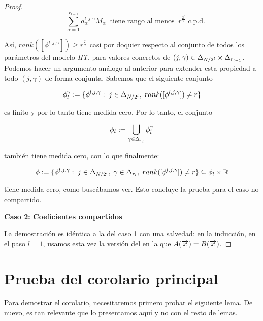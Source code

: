 \begin{proof}
    \begin{equation}
        [\phi^{l, j, \gamma}] = \sum_{\alpha = 1}^{r_{l-1}} a_\alpha^{l,j,\gamma} M_\alpha \;\; \text{tiene rango al menos} \; \; r^{\frac{2^l}{2}} \text{ c.p.d. }
    \end{equation}

    Así, $rank([\phi^{l, j, \gamma}]) \geq r^{\frac{2^l}{2}}$ casi por doquier respecto al conjunto de todos los parámetros del modelo \textit{HT}, para valores concretos de $(j, \gamma) \in \Delta_{N/2^l} \times \Delta_{r_{l-1}}$. Podemos hacer un argumento análogo al anterior para extender esta propiedad a todo $(j, \gamma)$ de forma conjunta. Sabemos que el siguiente conjunto

    \begin{equation}
        \phi_l^{\gamma} := \{ \phi^{l, j, \gamma}: \; j \in \Delta_{N/2^l}, \; rank([\phi^{l, j, \gamma}]) \neq r \}
    \end{equation}

    es finito y por lo tanto tiene medida cero. Por lo tanto, el conjunto

    \begin{equation}
        \phi_l := \bigcup_{\gamma \in \Delta_{r_l}} \phi_l^{\gamma}
    \end{equation}

    también tiene medida cero, con lo que finalmente:

    \begin{equation}
        \phi := \{ \phi^{l, j, \gamma}: \; j \in \Delta_{N/2^l}, \; \gamma \in \Delta_{r_l}, \; rank([\phi^{l, j, \gamma}]) \neq r \} \subseteq \phi_l \times \mathbb{R}
    \end{equation}

    tiene medida cero, como buscábamos ver. Esto concluye la prueba para el caso no compartido.

    \textbf{Caso 2: Coeficientes compartidos}

    La demostración es idéntica a la del caso 1 con una salvedad: en la inducción, en el paso $l = 1$, usamos esta vez la versión del  en la que $A(\overrightarrow{x}) = B(\overrightarrow{x})$.
\end{proof}

\section{Prueba del corolario principal}

Para demostrar el corolario, necesitaremos primero probar el siguiente lema. De nuevo, es tan relevante que lo presentamos aquí y no con el resto de lemas.

